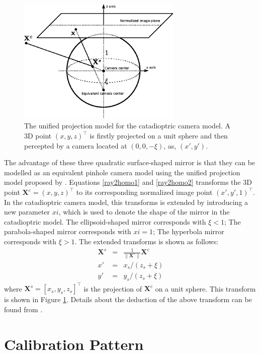 \documentclass{report}
\begin{document}
\begin{figure}
\centering
\includegraphics[width = 0.7\textwidth]{images/liftSphere.eps}
\caption{The unified projection model for the catadioptric camera model. A 3D point $(x, y, z)^\top$ is firstly projected on a unit sphere and then percepted by a camera located at $(0, 0, -\xi)$, as, $(x', y')$. }
\end{figure}


The advantage of these three quadratic surface-shaped mirror is that they can be modelled as an equivalent pinhole camera model using the unified projection model proposed by \cite{}. Equations \ref{ray2homo1} and \ref{ray2homo2} transforms the 3D point $\mathbf{X}^c = (x, y, z)^\top$ to its corresponding normalized image point $(x', y', 1)^\top$. In the catadioptric camera model, this transforms is extended by introducing a new parameter $xi$, which is used to denote the shape of the mirror in the catadioptric model. The ellipsoid-shaped mirror corresponds with $\xi < 1$; The parabola-shaped mirror corresponds with $xi = 1$; The hyperbola mirror corresponds with $\xi > 1$. The extended transforms is shown as follows: 
\begin{eqnarray}
\mathbf{X}^s &=&
\frac{1}{\| \mathbf{X}^c \|} \mathbf{X}^c \\
x' &=& x_s / (z_s + \xi) \\
y' &=& y_s / (z_s + \xi) 
\end{eqnarray}
where $\mathbf{X}^s = [x_s, y_s, z_s]^\top$ is the projection of $\mathbf{X}^c$ on a unit sphere. This transform is shown in Figure \ref{}. Details about the deduction of the above transform can be found from \cite{}. 

 

\chapter{Calibration Pattern}
\end{document}
